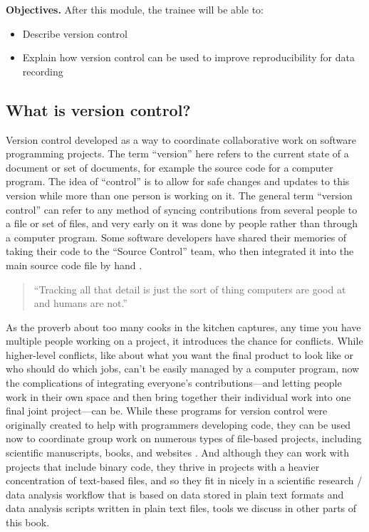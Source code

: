 \documentclass[]{tufte-book}
\providecommand{\tightlist}{%
  \setlength{\itemsep}{0pt}\setlength{\parskip}{0pt}}
\begin{document}
\textbf{Objectives.} After this module, the trainee will be able to:

\begin{itemize}
\tightlist
\item
  Describe version control\\
\item
  Explain how version control can be used to improve reproducibility
  for data recording
\end{itemize}

\hypertarget{what-is-version-control}{%
\subsection{What is version control?}\label{what-is-version-control}}

Version control developed as a way to coordinate collaborative work on
software programming projects. The term ``version'' here refers to the current
state of a document or set of documents, for example the source code for a
computer program. The idea of ``control'' is to allow for safe changes and updates
to this version while more than one person is working on it.
The general term ``version control'' can refer to any method of
syncing contributions from several people to a file or set of files, and
very early on it was done by people rather than through a computer program.
Some software developers have shared their memories of taking their
code to the ``Source Control'' team, who then integrated it into the main
source code file by hand \citep{irving2011astonishments}.

\begin{quote}
``Tracking all that detail is just the sort of thing computers
are good at and humans are not.'' \citep{raymond2003art}
\end{quote}

As the proverb about too many cooks in the kitchen captures, any time you have
multiple people working on a project, it introduces the chance for conflicts.
While higher-level conflicts, like about what you want the final product to look
like or who should do which jobs, can't be easily managed by a computer program,
now the complications of integrating everyone's contributions---and letting
people work in their own space and then bring together their individual work
into one final joint project---can be. While these programs for version control
were originally created to help with programmers developing code, they can be
used now to coordinate group work on numerous types of file-based projects,
including scientific manuscripts, books, and websites \citep{raymondunderstanding}.
And although they can work with projects that include binary code, they thrive
in projects with a heavier concentration of text-based files, and so they fit in
nicely in a scientific research / data analysis workflow that is based on data
stored in plain text formats and data analysis scripts written in plain text
files, tools we discuss in other parts of this book.
\end{document}
